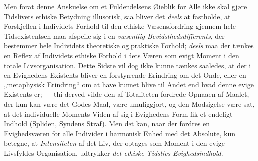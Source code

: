Men forat denne Anskuelse om et Fuldendelsens Øieblik for Alle ikke skal gjøre
Tidslivets ethiske Betydning
 illusorisk, saa bliver det \emph{deels} at fastholde, at Forskjellen i Individets
Forhold til den ethiske Væsensfordring gjennem hele Tidsexistentsen maa afspeile
sig i en \emph{væsentlig Bevidsthedsdifferents}, der bestemmer hele Individets
theoretiske og praktiske Forhold; \emph{deels} maa der tænkes en Reflex af
Individets ethiske Forhold i dets Væren som evigt Moment i den totale
Livsorganisation. Dette Sidste vil dog ikke kunne tænkes saaledes, at der i en
Evighedens Existents bliver en forstyrrende Erindring om det Onde, eller en
„metaphysisk Erindring“ om at have kunnet blive til Andet end hvad denne evige
Existents er; --- thi derved vilde den af Totaliteten fordrede Opnaaen af Maalet,
der kun kan være det Godes Maal, være umuliggjort, og den Modsigelse være sat, at
det individuelle Moments Viden af sig i Evighedens Form fik et endeligt Indhold
(Spliden, Syndens Straf). Men det kan, naar der fordres en Evighedsværen for alle
Individer i harmonisk Enhed med det Absolute, kun betegne, at \emph{Intensiteten}
af det Liv, der optages som Moment i den evige Livsfyldes Organisation, udtrykker
\emph{det ethiske Tidslivs Evighedsindhold}.

